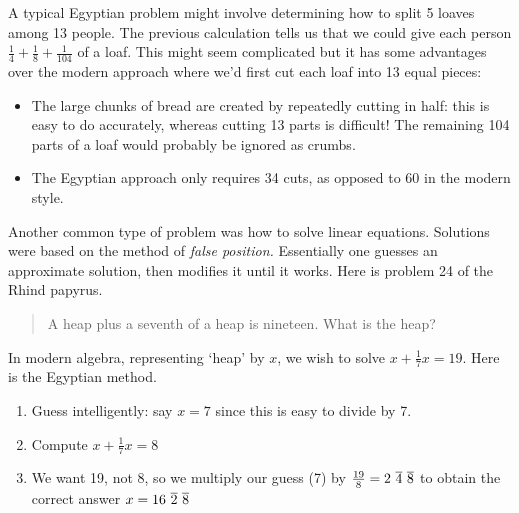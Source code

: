 A typical Egyptian problem might involve determining how to split 5 loaves among 13 people. The previous calculation tells us that we could give each person $\frac 14+\frac 18+\frac 1{104}$ of a loaf. This might seem complicated but it has some advantages over the modern approach where we'd first cut each loaf into 13 equal pieces:
\begin{itemize}
  \item The large chunks of bread are created by repeatedly cutting in half: this is easy to do accurately, whereas cutting 13\th{} parts is difficult! The remaining 104\th{} parts of a loaf would probably be ignored as crumbs.
  \item The Egyptian approach only requires 34 cuts, as opposed to 60 in the modern style.
\end{itemize}




Another common type of problem was how to solve linear equations. Solutions were based on the method of \emph{false position.} Essentially one guesses an approximate solution, then modifies it until it works. Here is problem 24 of the Rhind papyrus.
\begin{quote}
	A heap plus a seventh of a heap is nineteen. What is the heap?
\end{quote}
In modern algebra, representing `heap' by $x$, we wish to solve $x+\frac 17x=19$. Here is the Egyptian method.
\begin{enumerate}
  \item Guess intelligently: say $x=7$ since this is easy to divide by 7.
  \item Compute $x+\frac 17 x=8$
  \item We want 19, not 8, so we multiply our guess (7) by $\frac{19}8=2\ \overline{4}\ \overline{8}$ to obtain the correct answer $x=16\ \overline{2}\ \overline{8}$
\end{enumerate}


